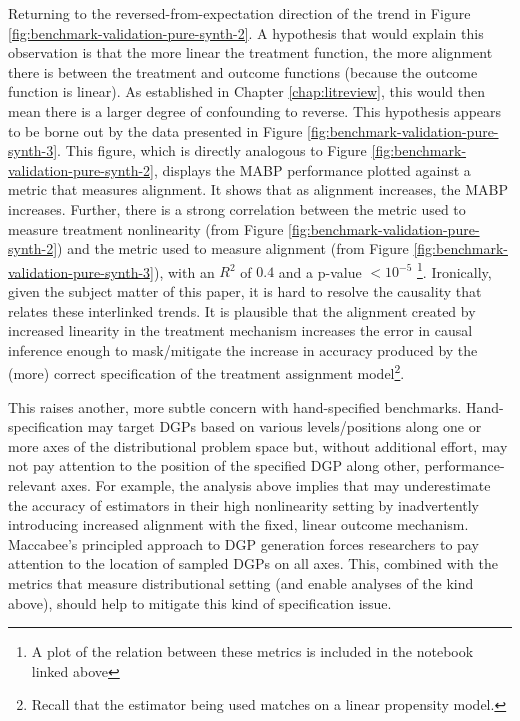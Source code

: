 \documentclass[../main.tex]{subfiles}
\begin{document}
Returning to the reversed-from-expectation direction of the trend in Figure \ref{fig:benchmark-validation-pure-synth-2}. A hypothesis that would explain this observation is that the more linear the treatment function, the more alignment there is between the treatment and outcome functions (because the outcome function is linear). As established in Chapter \ref{chap:litreview}, this would then mean there is a larger degree of confounding to reverse. This hypothesis appears to be borne out by the data presented in Figure \ref{fig:benchmark-validation-pure-synth-3}. This figure, which is directly analogous to Figure \ref{fig:benchmark-validation-pure-synth-2}, displays the MABP performance plotted against a metric that measures alignment. It shows that as alignment increases, the MABP increases. Further, there is a strong correlation between the metric used to measure treatment nonlinearity (from Figure \ref{fig:benchmark-validation-pure-synth-2}) and the metric used to measure alignment (from Figure \ref{fig:benchmark-validation-pure-synth-3}), with an $R^2$ of $0.4$ and a p-value $< 10^{-5}$ \footnote{A plot of the relation between these metrics is included in the notebook linked above}. Ironically, given the subject matter of this paper, it is hard to resolve the causality that relates these interlinked trends. It is plausible that the alignment created by increased linearity in the treatment mechanism increases the error in causal inference enough to mask/mitigate the increase in accuracy produced by the (more) correct specification of the treatment assignment model\footnote{Recall that the estimator being used matches on a linear propensity model.}.

\vspace{\baselineskip}

This raises another, more subtle concern with hand-specified benchmarks. Hand-specification may target DGPs based on various levels/positions along one or more axes of the distributional problem space but, without additional effort, may not pay attention to the position of the specified DGP along other, performance-relevant axes. For example, the analysis above implies that \textcite{Diamond2013GeneticStudies} may underestimate the accuracy of estimators in their high nonlinearity setting by inadvertently introducing increased alignment with the fixed, linear outcome mechanism. Maccabee's principled approach to DGP generation forces researchers to pay attention to the location of sampled DGPs on all axes. This, combined with the metrics that measure distributional setting (and enable analyses of the kind above), should help to mitigate this kind of specification issue.
\end{document}
